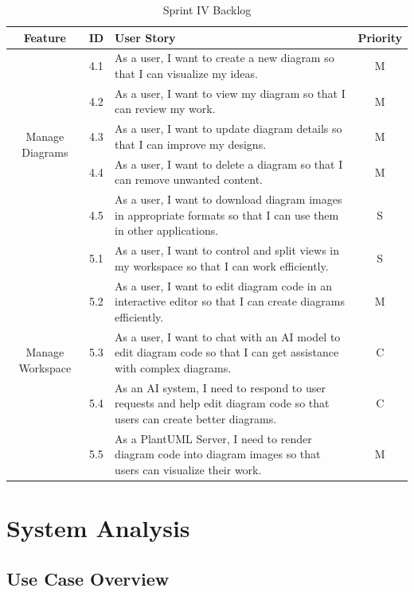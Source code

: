 \begin{table}[H]
\centering
\caption{Sprint IV Backlog}
\begin{tabularx}{\textwidth}{|c|c|X|c|}
\hline
\textbf{Feature} & \textbf{ID} & \textbf{User Story} & \textbf{Priority} \\
\hline
\multirow{5}{*}{Manage Diagrams} & 4.1 & As a user, I want to create a new diagram so that I can visualize my ideas. & M \\
\cline{2-4}
& 4.2 & As a user, I want to view my diagram so that I can review my work. & M \\
\cline{2-4}
& 4.3 & As a user, I want to update diagram details so that I can improve my designs. & M \\
\cline{2-4}
& 4.4 & As a user, I want to delete a diagram so that I can remove unwanted content. & M \\
\cline{2-4}
& 4.5 & As a user, I want to download diagram images in appropriate formats so that I can use them in other applications. & S \\
\hline
\multirow{5}{*}{Manage Workspace} & 5.1 & As a user, I want to control and split views in my workspace so that I can work efficiently. & S \\
\cline{2-4}
& 5.2 & As a user, I want to edit diagram code in an interactive editor so that I can create diagrams efficiently. & M \\
\cline{2-4}
& 5.3 & As a user, I want to chat with an AI model to edit diagram code so that I can get assistance with complex diagrams. & C \\
\cline{2-4}
& 5.4 & As an AI system, I need to respond to user requests and help edit diagram code so that users can create better diagrams. & C \\
\cline{2-4}
& 5.5 & As a PlantUML Server, I need to render diagram code into diagram images so that users can visualize their work. & M \\
\hline
\end{tabularx}
\end{table}

\section{System Analysis}

\subsection{Use Case Overview}

